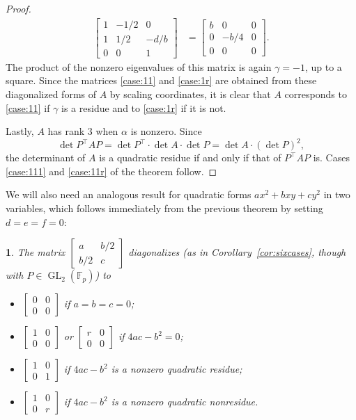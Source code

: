 \documentclass[10pt,a4paper]{amsart}
\numberwithin{equation}{section}
\numberwithin{figure}{section}
\theoremstyle{definition}
\theoremstyle{plain}
\theoremstyle{remark}
\theoremstyle{plain}
\newtheorem{cor}[thm]{\protect\corollaryname}
\theoremstyle{definition}
\theoremstyle{plain}
\theoremstyle{plain}
\providecommand{\corollaryname}{Corollary}
\newcommand{\F}{\mathbb{F}}
\newcommand{\GL}{\operatorname{GL}}
\begin{document}
\begin{proof}
\begin{align*}
\begin{bmatrix}
			1 & -1/2 & 0\\
			1 & 1/2 & -d/b\\
			0 & 0 & 1
		\end{bmatrix}
		&=
		\begin{bmatrix}
			b&0&0\\
			0&-b/4&0\\
			0&0&0
		\end{bmatrix}.
	\end{align*}
	The product of the nonzero eigenvalues of this matrix is again $\gamma=-1$, up to a square. Since the matrices \eqref{case:11} and \eqref{case:1r} are obtained from these diagonalized forms of $A$ by scaling coordinates, it is clear that $A$ corresponds to \eqref{case:11} if $\gamma$ is a residue and to \eqref{case:1r} if it is not.
	
	Lastly, $A$ has rank $3$ when $\alpha$ is nonzero. Since
	\begin{equation*}
	\det P^\top AP=\det P^\top \cdot\det A\cdot\det P=\det A\cdot(\det P)^2,
	\end{equation*}
	the determinant of $A$ is a quadratic residue if and only if that of $P^\top AP$ is. Cases \eqref{case:111} and \eqref{case:11r} of the theorem follow.
	\end{proof}
	
	We will also need an analogous result for quadratic forms $ax^2+bxy+cy^2$ in two variables, which follows immediately from the previous theorem by setting $d=e=f=0$:
	\begin{cor}\label{cor:diag-P1}
	The matrix $\left[\begin{smallmatrix}a&b/2\\b/2&c\end{smallmatrix}\right]$ diagonalizes (as in Corollary~\ref{cor:sixcases}, though with $P \in \GL_2(\F_p)$) to
	\begin{itemize}
	\item $\left[\begin{smallmatrix}0&0\\0&0\end{smallmatrix}\right]$ if $a=b=c=0$;
	\item $\left[\begin{smallmatrix}1&0\\0&0\end{smallmatrix}\right]$ or $\left[\begin{smallmatrix}r&0\\0&0\end{smallmatrix}\right]$ if $4ac-b^2=0$;
	\item $\left[\begin{smallmatrix}1&0\\0&1\end{smallmatrix}\right]$ if $4ac-b^2$ is a nonzero quadratic residue;
	\item $\left[\begin{smallmatrix}1&0\\0&r\end{smallmatrix}\right]$ if $4ac-b^2$ is a nonzero quadratic nonresidue.
	\end{itemize}
	\end{cor}
	
\end{document}
